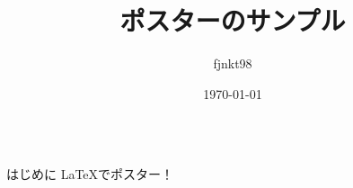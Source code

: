 \documentclass[dvipdfmx, final, t]{beamer}
\title{ポスターのサンプル}
\author{fjnkt98}
\institute{NITIC}
\date{\today}
\begin{document}
\begin{frame}
  \begin{columns}[t]
    \begin{column}{.32\linewidth}
      \begin{block}{はじめに}
        \LaTeX でポスター！
      \end{block}
    \end{column}
  \end{columns}
\end{frame}
\end{document}
